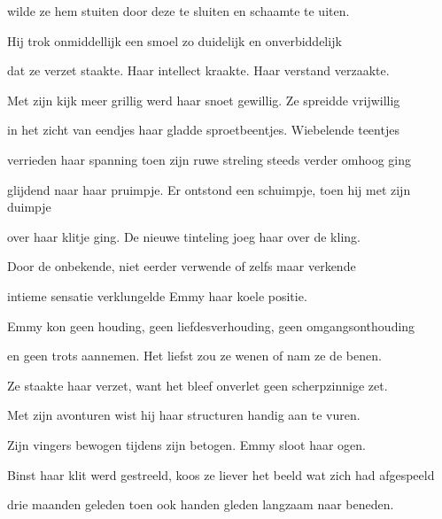 wilde ze hem stuiten
door deze te sluiten
en schaamte te uiten.

Hij trok onmiddellijk
een smoel zo duidelijk
en onverbiddelijk

dat ze verzet staakte.
Haar intellect kraakte.
Haar verstand verzaakte.

Met zijn kijk meer grillig
werd haar snoet gewillig.
Ze spreidde vrijwillig

in het zicht van eendjes
haar gladde sproetbeentjes.
Wiebelende teentjes

verrieden haar spanning
toen zijn ruwe streling
steeds verder omhoog ging

glijdend naar haar pruimpje.
Er ontstond een schuimpje,
toen hij met zijn duimpje

over haar klitje ging.
De nieuwe tinteling
joeg haar over de kling.

Door de onbekende,
niet eerder verwende
of zelfs maar verkende

intieme sensatie
verklungelde Emmy
haar koele positie.

Emmy kon geen houding,
geen liefdesverhouding,
geen omgangsonthouding

en geen trots aannemen.
Het liefst zou ze wenen
of nam ze de benen.

Ze staakte haar verzet,
want het bleef onverlet
geen scherpzinnige zet.

Met zijn avonturen
wist hij haar structuren
handig aan te vuren.

Zijn vingers bewogen
tijdens zijn betogen.
Emmy sloot haar ogen.

Binst haar klit werd gestreeld,
koos ze liever het beeld
wat zich had afgespeeld

drie maanden geleden
toen ook handen gleden
langzaam naar beneden.
